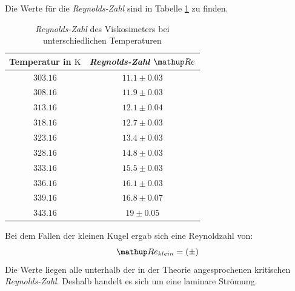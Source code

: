 
Die Werte für die \emph{Reynolds-Zahl} sind in Tabelle \ref{tab:rey_visko} %
zu finden.

\begin{table}
\centering
\begin{tabular} {cc}
  \toprule
  Temperatur in $\si{\kelvin}$ & \emph{Reynolds-Zahl} $\map{Re}$ \\
  \midrule
  $\num{303.16}$ & $\num{11.1}\pm \num{0.03}$ \\
  $\num{308.16}$ & $\num{11.9}\pm \num{0.03}$ \\
  $\num{313.16}$ & $\num{12.1}\pm \num{0.04}$ \\
  $\num{318.16}$ & $\num{12.7}\pm \num{0.03}$ \\
  $\num{323.16}$ & $\num{13.4}\pm \num{0.03}$ \\
  $\num{328.16}$ & $\num{14.8}\pm \num{0.03}$ \\
  $\num{333.16}$ & $\num{15.5}\pm \num{0.03}$ \\
  $\num{336.16}$ & $\num{16.1}\pm \num{0.03}$ \\
  $\num{339.16}$ & $\num{16.8}\pm \num{0.07}$ \\
  $\num{343.16}$ & $\num{19}\pm \num{0.05}$ \\
\bottomrule
\end{tabular}
\caption{\emph{Reynolds-Zahl} des Viskosimeters bei unterschiedlichen Temperaturen} %
\label{tab:rey_visko}
\end{table}


Bei dem Fallen der kleinen Kugel ergab sich eine Reynoldzahl von:
\begin{equation*}%
\map{Re}_{klein}=\left(\num{}\pm\num{}\right)
\end{equation*}
Die Werte liegen alle unterhalb der in der Theorie angesprochenen kritischen \emph{Reynolds-Zahl}. %
Deshalb handelt es sich um eine laminare Strömung.


